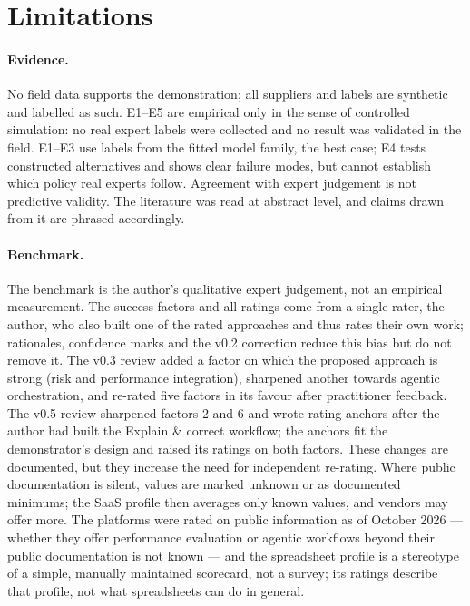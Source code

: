\documentclass[10pt,twocolumn,a4paper]{article}
\begin{document}
\section{Limitations}
\label{sec:limitations}

\paragraph{Evidence.} No field data supports the demonstration; all suppliers and labels
are synthetic and labelled as such. E1--E5 are empirical only in the sense of controlled
simulation: no real expert labels were collected and no result was validated in the
field. E1--E3 use labels from the fitted model family, the
best case; E4 tests constructed alternatives and shows clear failure modes, but cannot
establish which policy real experts follow. Agreement with expert judgement is not
predictive validity. The literature was read at abstract level, and claims drawn from it
are phrased accordingly.

\paragraph{Benchmark.} The benchmark is the author's qualitative expert judgement, not an
empirical measurement. The success factors and all ratings come from a single rater, the
author, who also built one of the rated approaches and thus rates their own work; rationales, confidence marks and the v0.2 correction reduce this
bias but do not remove it. The v0.3 review added a factor on which the proposed approach
is strong (risk and performance integration), sharpened another towards agentic
orchestration, and re-rated five factors in its favour after practitioner feedback. The v0.5
review sharpened factors 2 and 6 and wrote rating anchors after the author had built the
Explain \& correct workflow; the anchors fit the demonstrator's design and raised its ratings on
both factors. These changes are documented, but they increase the need for independent
re-rating. Where public documentation is silent, values are marked unknown or as documented
minimums; the SaaS profile then averages only known values, and vendors may offer more. The
platforms were rated on public information as of October 2026 --- whether they offer
performance evaluation or agentic workflows beyond their public documentation is not
known --- and the spreadsheet profile is a stereotype of a simple, manually maintained
scorecard, not a survey; its ratings describe that profile, not what spreadsheets can do in
general.
\end{document}
